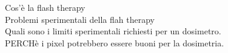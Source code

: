 \begin{titlepage}
Cos'è la flash therapy\\
Problemi sperimentali della flah therapy\\
Quali sono i limiti sperimentali richiesti per un dosimetro.\\
PERCHè i pixel potrebbero essere buoni per la dosimetria.\\

\end{titlepage}
